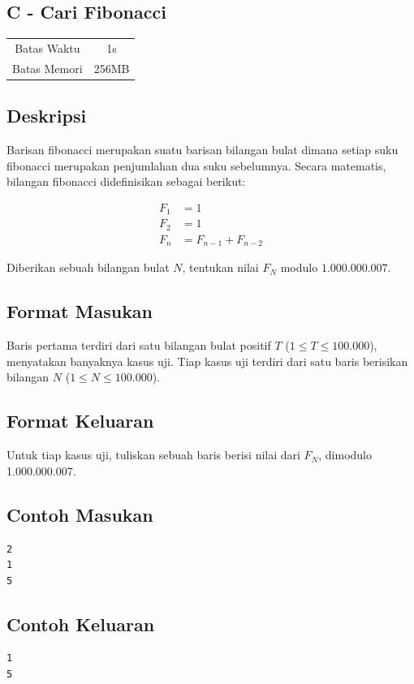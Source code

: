 \documentclass{article}
\begin{document}
\begin{center}
    \section*{C - Cari Fibonacci}

    \begin{tabular}{ | c c | }
        \hline
        Batas Waktu  & 1s \\
        Batas Memori & 256MB \\
        \hline
    \end{tabular}
\end{center}

\subsection*{Deskripsi}

Barisan fibonacci merupakan suatu barisan bilangan bulat dimana setiap suku fibonacci merupakan penjumlahan dua suku sebelumnya. Secara matematis, bilangan fibonacci didefinisikan sebagai berikut:

\begin{align*}
F_1 & = 1 \\
F_2 & = 1 \\
F_n & = F_{n-1} + F_{n-2}
\end{align*}

Diberikan sebuah bilangan bulat $N$, tentukan nilai $F_N$ modulo $1.000.000.007$.

\subsection*{Format Masukan}

Baris pertama terdiri dari satu bilangan bulat positif $T$ ($1 \leq T \leq 100.000$), menyatakan banyaknya kasus uji.
Tiap kasus uji terdiri dari satu baris berisikan bilangan $N$ ($1 \leq N \leq 100.000$).

\subsection*{Format Keluaran}

Untuk tiap kasus uji, tuliskan sebuah baris berisi nilai dari $F_N$, dimodulo 1.000.000.007.
\\

\begin{multicols}{2}
\subsection*{Contoh Masukan}
\begin{lstlisting}
2
1
5
\end{lstlisting}
\columnbreak
\subsection*{Contoh Keluaran}
\begin{lstlisting}
1
5
\end{lstlisting}
\vfill
\null
\end{multicols}

\pagebreak
\end{document}
